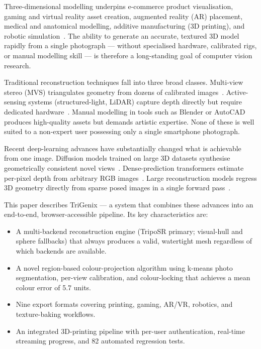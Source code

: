 ﻿\documentclass[conference]{IEEEtran}
\begin{document}
Three-dimensional modelling underpins e-commerce product visualisation, gaming and virtual reality asset creation,
augmented reality (AR) placement, medical and anatomical modelling, additive manufacturing (3D printing), and
robotic simulation~\cite{survey_3d}. The ability to generate an accurate, textured 3D model rapidly from a single
photograph — without specialised hardware, calibrated rigs, or manual modelling skill — is therefore a long-standing
goal of computer vision research.

Traditional reconstruction techniques fall into three broad classes. Multi-view stereo (MVS) triangulates geometry
from dozens of calibrated images~\cite{mvs}. Active-sensing systems (structured-light, LiDAR) capture depth
directly but require dedicated hardware~\cite{active_sensing}. Manual modelling in tools such as Blender or
AutoCAD produces high-quality assets but demands artistic expertise. None of these is well suited to a non-expert
user possessing only a single smartphone photograph.

Recent deep-learning advances have substantially changed what is achievable from one image. Diffusion models
trained on large 3D datasets synthesise geometrically consistent novel views~\cite{zero123pp}. Dense-prediction
transformers estimate per-pixel depth from arbitrary RGB images~\cite{dpt}. Large reconstruction models regress
3D geometry directly from sparse posed images in a single forward pass~\cite{lrm,triposr,instantmesh}.

This paper describes TriGenix — a system that combines these advances into an end-to-end, browser-accessible
pipeline. Its key characteristics are:
\begin{itemize}
  \item A multi-backend reconstruction engine (TripoSR primary; visual-hull and sphere fallbacks) that
        always produces a valid, watertight mesh regardless of which backends are available.
  \item A novel region-based colour-projection algorithm using k-means photo segmentation, per-view
        calibration, and colour-locking that achieves a mean colour error of 5.7 units.
  \item Nine export formats covering printing, gaming, AR/VR, robotics, and texture-baking workflows.
  \item An integrated 3D-printing pipeline with per-user authentication, real-time streaming progress,
        and 82 automated regression tests.
\end{itemize}
\end{document}
